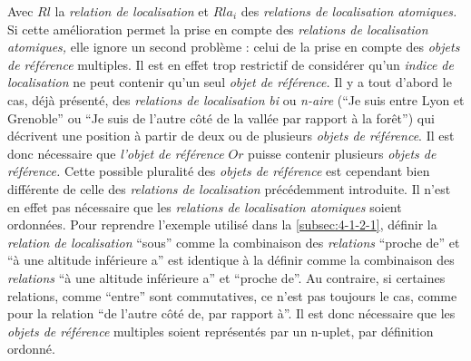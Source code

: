 Avec \(Rl\) la \emph{relation de localisation} et \(Rla_i\) des
\emph{relations de localisation atomiques.} Si cette amélioration
permet la prise en compte des \emph{relations de localisation
  atomiques,} elle ignore un second problème : celui de la prise en
compte des \emph{objets de référence} multiples. Il est en effet trop
restrictif de considérer qu'un \emph{indice de localisation} ne peut
contenir qu'un seul \emph{objet de référence.}  Il y a tout d'abord le
cas, déjà présenté, des \emph{relations de localisation} \emph{bi} ou
\emph{n-aire} (\eg \enquote{Je suis entre Lyon et Grenoble} ou
\enquote{Je suis de l'autre côté de la vallée par rapport à la forêt})
qui décrivent une position à partir de deux ou de plusieurs
\emph{objets de référence}. Il est donc nécessaire que \emph{l'objet
  de référence} \(Or\) puisse contenir plusieurs \emph{objets de
  référence.} Cette possible pluralité des \emph{objets de référence}
est cependant bien différente de celle des \emph{relations de
  localisation} précédemment introduite. Il n'est en effet pas
nécessaire que les \emph{relations de localisation atomiques} soient
ordonnées. Pour reprendre l'exemple utilisé dans la
\autoref{subsec:4-1-2-1}, définir la \emph{relation de localisation}
\enquote{sous} comme la combinaison des \emph{relations}
\enquote{proche de} et \enquote{à une altitude inférieure a} est
identique à la définir comme la combinaison des \emph{relations}
\enquote{à une altitude inférieure a} et \enquote{proche de}. Au
contraire, si certaines relations, comme \enquote{entre} sont
commutatives, ce n'est pas toujours le cas, comme pour la relation
\enquote{de l'autre côté de, par rapport à}. Il est donc nécessaire
que les \emph{objets de référence} multiples soient représentés par un
n-uplet, par définition ordonné.


